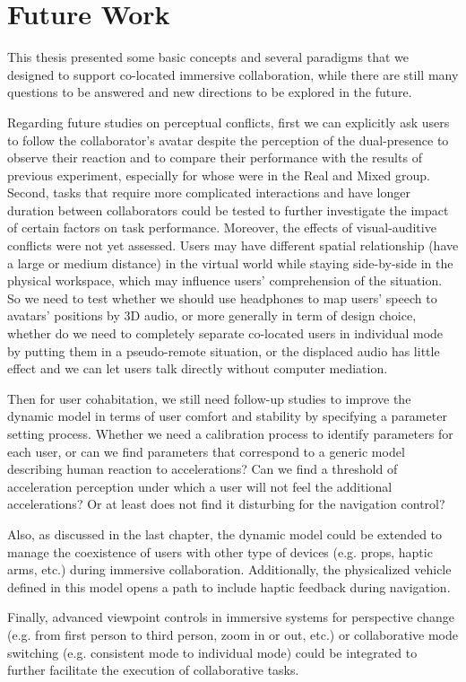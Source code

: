 \section*{Future Work}

This thesis presented some basic concepts and several paradigms that we designed to support co-located immersive collaboration, while there are still many questions to be answered and new directions to be explored in the future.

Regarding future studies on perceptual conflicts, first we can explicitly ask users to follow the collaborator's avatar despite the perception of the dual-presence to observe their reaction and to compare their performance with the results of previous experiment, especially for whose were in the Real and Mixed group. Second, tasks that require more complicated interactions and have longer duration between collaborators could be tested to further investigate the impact of certain factors on task performance. Moreover, the effects of visual-auditive conflicts were not yet assessed. Users may have different spatial relationship (have a large or medium distance) in the virtual world while staying side-by-side in the physical workspace, which may influence users' comprehension of the situation. So we need to test whether we should use headphones to map users' speech to avatars' positions by 3D audio, or more generally in term of design choice, whether do we need to completely separate co-located users in individual mode by putting them in a pseudo-remote situation, or the displaced audio has little effect and we can let users talk directly without computer mediation.

Then for user cohabitation, we still need follow-up studies to improve the dynamic model in terms of user comfort and stability by specifying a parameter setting process. Whether we need a calibration process to identify parameters for each user, or can we find parameters that correspond to a generic model describing human reaction to accelerations? Can we find a threshold of acceleration perception under which a user will not feel the additional accelerations? Or at least does not find it disturbing for the navigation control?

Also, as discussed in the last chapter, the dynamic model could be extended to manage the coexistence of users with other type of devices (e.g. props, haptic arms, etc.) during immersive collaboration. Additionally, the physicalized vehicle defined in this model opens a path to include haptic feedback during navigation.

Finally, advanced viewpoint controls in immersive systems for perspective change (e.g. from first person to third person, zoom in or out, etc.) or collaborative mode switching (e.g. consistent mode to individual mode) could be integrated to further facilitate the execution of collaborative tasks.
